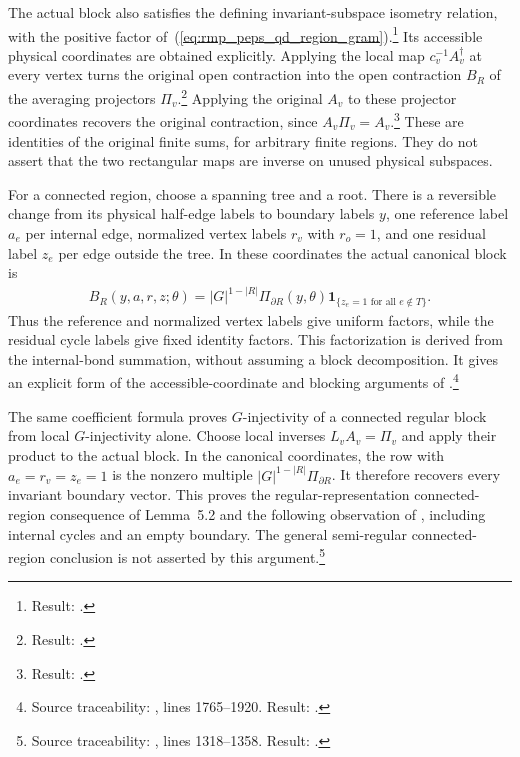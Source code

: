 \documentclass{article}
\begin{document}
The actual block also satisfies the defining invariant-subspace isometry
relation, with the positive factor of~(\ref{eq:rmp_peps_qd_region_gram}).\footnote{Result:
    .}
Its accessible physical
coordinates are obtained explicitly. Applying the local map
$c_v^{-1}A_v^\dagger$ at every vertex turns the original open contraction
into the open contraction $B_R$ of the averaging projectors $\Pi_v$.\footnote{Result:
    .}
Applying the original $A_v$ to these projector coordinates recovers the
original contraction, since $A_v\Pi_v=A_v$.\footnote{Result:
    .}
These are identities of
the original finite sums, for arbitrary finite regions. They do not
assert that the two rectangular maps are inverse on unused physical
subspaces.

For a connected region, choose a spanning tree and a root. There is a
reversible change from its physical half-edge labels to boundary labels
$y$, one reference label $a_e$ per internal edge, normalized vertex
labels $r_v$ with $r_o=1$, and one residual label $z_e$ per edge outside
the tree. In these coordinates the actual canonical block is
\begin{align}
 B_R(y,a,r,z;\theta)
   =|G|^{1-|R|}\Pi_{\partial R}(y,\theta)
     \mathbf 1_{\{z_e=1\text{ for all }e\notin T\}}.
    \label{eq:rmp_peps_qd_canonical_block}
\end{align}
Thus the reference and normalized vertex labels give uniform factors,
while the residual cycle labels give fixed identity factors. This
factorization is derived from the internal-bond summation, without
assuming a block decomposition. It gives an explicit form of the
accessible-coordinate and blocking arguments of
\cite{Schuch2010PEPS}.\footnote{Source traceability:
    , lines 1765--1920. Result:
    .}

The same coefficient formula proves $G$-injectivity of a connected
regular block from local $G$-injectivity alone. Choose local inverses
$L_vA_v=\Pi_v$ and apply their product to the actual block. In the
canonical coordinates, the row with $a_e=r_v=z_e=1$ is the nonzero
multiple $|G|^{1-|R|}\Pi_{\partial R}$. It therefore recovers every
invariant boundary vector. This proves the regular-representation
connected-region consequence of Lemma~5.2 and the following
observation of \cite{Schuch2010PEPS}, including internal cycles and an
empty boundary. The general semi-regular connected-region conclusion
is not asserted by this argument.\footnote{Source traceability:
    , lines 1318--1358. Result:
    .}
\end{document}
